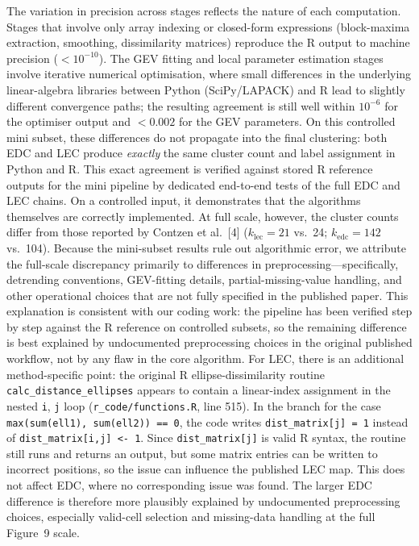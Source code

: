 \documentclass[preprint,12pt,a4paper]{elsarticle}
\newcommand{\revo}[1]{{\color{RevisionOrange}#1}}
\begin{document}
{The variation in precision across stages reflects the nature of
each computation. Stages that involve only array indexing or
closed-form expressions (block-maxima extraction, smoothing,
dissimilarity matrices) reproduce the R output to machine
precision ($< 10^{-10}$). The GEV fitting and local parameter
estimation stages involve iterative numerical optimisation, where
small differences in the underlying linear-algebra libraries
between Python (SciPy/LAPACK) and R lead to slightly different
convergence paths; the resulting agreement is still well within
$10^{-6}$ for the optimiser output and $< 0.002$ for the GEV
parameters. On this controlled mini subset, these differences do
not propagate into the final clustering: both EDC and LEC produce
\emph{exactly} the same cluster count and label assignment in
Python and R. This exact agreement is verified against stored R
reference outputs for the mini pipeline by dedicated end-to-end
tests of the full EDC and LEC chains. On a controlled input, it
demonstrates that the algorithms themselves are correctly
implemented. At full scale, however, the cluster counts differ
from those reported by Contzen et al.~[4] ($k_{\text{lec}} = 21$
vs.\ 24; $k_{\text{edc}} = 142$ vs.\ 104). Because the
mini-subset results rule out algorithmic error, we attribute
the full-scale discrepancy primarily to differences in
preprocessing---specifically, detrending conventions, GEV-fitting
details, partial-missing-value handling, and other operational
choices that are not fully specified in the published paper.
This explanation is consistent with our
coding work: the pipeline has been verified step by step against the
R reference on controlled subsets, so the remaining difference \revo{is best explained by undocumented preprocessing
choices in the original published workflow, not by any flaw in the core algorithm.} For LEC, there is an additional method-specific
point: the original R ellipse-dissimilarity routine
\texttt{calc\_distance\_ellipses} appears to contain a linear-index
assignment in the nested \texttt{i}, \texttt{j} loop
(\texttt{r\_code/functions.R}, line 515). In the branch for the case
\texttt{max(sum(ell1), sum(ell2)) == 0}, the code writes
\texttt{dist\_matrix[j] = 1} instead of \texttt{dist\_matrix[i,j] <- 1}.
Since \texttt{dist\_matrix[j]} is valid R syntax, the routine still
runs and returns an output, but some matrix entries can be written to
incorrect positions, so the issue can influence the published LEC map.
This does not affect EDC, where no corresponding issue was found. The
larger EDC difference is therefore more plausibly explained by
undocumented preprocessing choices, especially valid-cell selection
and missing-data handling at the full Figure~9 scale.

}
\end{document}
